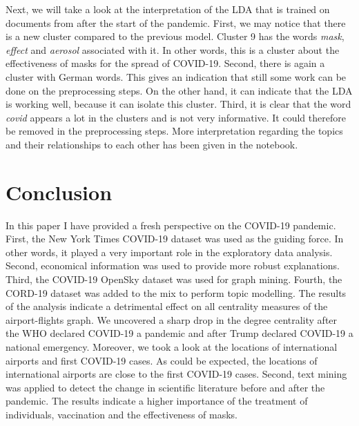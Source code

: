 \documentclass[10pt, a4paper, twocolumn]{article} %
\begin{document}
Next, we will take a look at the interpretation of the LDA that is trained on documents from after the start of the pandemic.
First, we may notice that there is a new cluster compared to the previous model. Cluster 9 has the words \textit{mask}, \textit{effect} and \textit{aerosol} associated with it. In other words, this is a cluster about the effectiveness of masks for the spread of COVID-19.
Second, there is again a cluster with German words. This gives an indication that still some work can be done on the preprocessing steps. On the other hand, it can indicate that the LDA is working well, because it can isolate this cluster.
Third, it is clear that the word \textit{covid} appears a lot in the clusters and is not very informative. It could therefore be removed in the preprocessing steps. More interpretation regarding the topics and their relationships to each other has been given in the notebook.

\section{Conclusion}

In this paper I have provided a fresh perspective on the COVID-19 pandemic. First, the New York Times COVID-19 dataset was used as the guiding force. In other words, it played a very important role in the exploratory data analysis. Second, economical information was used to provide more robust explanations. Third, the COVID-19 OpenSky dataset was used for graph mining. Fourth, the CORD-19 dataset was added to the mix to perform topic modelling.
The results of the analysis indicate a detrimental effect on all centrality measures of the airport-flights graph. We uncovered a sharp drop in the degree centrality after the WHO declared COVID-19 a pandemic and after Trump declared COVID-19 a national emergency. Moreover, we took a look at the locations of international airports and first COVID-19 cases. As could be expected, the locations of international airports are close to the first COVID-19 cases.
Second, text mining was applied to detect the change in scientific literature before and after the pandemic. The results indicate a higher importance of the treatment of individuals, vaccination and the effectiveness of masks.

\hspace{20px}

\hspace{20px}

\hspace{20px}
\end{document}
